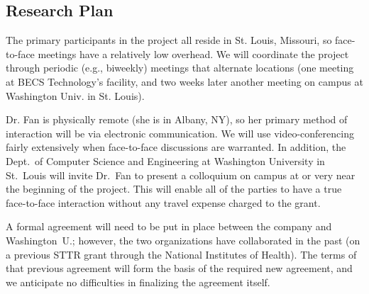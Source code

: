 \subsection{Research Plan}
\label{sec:plan}

The primary participants in the project all reside in St. Louis, Missouri,
so face-to-face meetings have a relatively low overhead. We will coordinate
the project through periodic (e.g., biweekly) meetings that alternate
locations (one meeting at BECS Technology's facility, and two weeks later
another meeting on campus at Washington Univ. in St. Louis).

Dr. Fan is physically remote (she is in Albany, NY), so her primary
method of interaction will be via electronic communication.  We will
use video-conferencing fairly extensively when face-to-face discussions
are warranted.  In addition, the Dept.~of Computer Science and Engineering
at Washington University in St.~Louis
will invite Dr.~Fan to present a colloquium on campus at or very near
the beginning of the project.  This will enable all of the parties to
have a true face-to-face interaction without any travel expense charged
to the grant.

A formal agreement will need to be put in place between the company and
Washington~U.; however, the two organizations have collaborated in the
past (on a previous STTR grant through the National Institutes of Health).
The terms of that previous agreement will form the
basis of the required new agreement, and we anticipate no difficulties
in finalizing the agreement itself.


